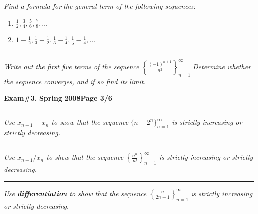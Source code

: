 \documentclass[12pt]{article}
\begin{document}
{\bigskip
{\problem[10 pts] \em  Find a formula for the general term of the following sequences:} 
\begin{enumerate}
\item $\displaystyle{\frac{1}{2}, \frac{3}{4}, \frac{5}{6}, \frac{7}{8}, \dotsc}$
\bigskip
\begin{flushright}
\end{flushright}
\item $\displaystyle{1-\frac{1}{2}, \frac{1}{3} - \frac{1}{2}, \frac{1}{3} - \frac{1}{4}, \frac{1}{5}-\frac{1}{4}, \dotsc}$
\vspace{3cm}
\begin{flushright}
\end{flushright}
\end{enumerate}
\hrule
{\problem[10pts] \em Write out the first five terms of the sequence $\left\{ \displaystyle{\frac{(-1)^{n+1}}{n^2}} \right\}_{n=1}^\infty$ \newline Determine whether the sequence converges, and if so find its limit.
\vspace{7cm}
\begin{flushright}
\end{flushright}
\newpage


\hfill{\large\bf Exam\#3.}\hfill{\large\bf
  Spring 2008}\hfill{\large\bf Page 3/6}\hrule

\bigskip
{\problem[5 pts] \em Use $x_{n+1}-x_n$ to show that the sequence $\big\{ n-2^n \big\}_{n=1}^\infty$ is strictly increasing or strictly decreasing.}
\vspace{6.5cm}
\hrule
{\problem[5 pts] \em Use $x_{n+1}/x_n$ to show that the sequence $\left\{ \displaystyle{\frac{n^n}{n!}} \right\}_{n=1}^\infty$ is strictly increasing or strictly decreasing.}
\vspace{6.5cm}
\hrule
{\problem[5 pts] \em Use \textbf{differentiation} to show that the sequence $\left\{ \displaystyle{\frac{n}{2n+1}} \right\}_{n=1}^\infty$ is strictly increasing or strictly decreasing.}
\newpage

}}
\end{document}
